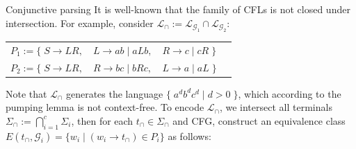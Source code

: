 \documentclass{beamer}
\begin{document}
\begin{frame}[fragile]{Conjunctive parsing}
  It is well-known that the family of CFLs is not closed under intersection. For example, consider $\mathcal{L}_\cap := \mathcal{L}_{\mathcal{G}_1} \cap \mathcal{L}_{\mathcal{G}_2}$:

  \begin{table}[H]
    \begin{tabular}{llll}
      $P_1 := \big\{\;S \rightarrow L R,$ & $L \rightarrow a b \mid a L b,$ & $R \rightarrow c \mid c R\;\big\}$\vspace{5pt} \\
      $P_2 := \big\{\;S \rightarrow L R,$ & $R \rightarrow b c \mid b R c,$ & $L \rightarrow a \mid a L\;\big\}$
    \end{tabular}
  \end{table}

  \noindent Note that $\mathcal{L}_\cap$ generates the language $\big\{\;a^d b^d c^d \mid d > 0\;\big\}$, which according to the pumping lemma is not context-free. To encode $\mathcal{L}_\cap$, we intersect all terminals $\Sigma_\cap := \bigcap_{i=1}^c \Sigma_i$, then for each $t_\cap \in \Sigma_\cap$ and CFG, construct an equivalence class $E(t_\cap, \mathcal{G}_i) = \{ w_i \mid (w_i \rightarrow t_\cap) \in P_i\}$ as follows:\vspace{-5pt}


\end{frame}
\end{document}
